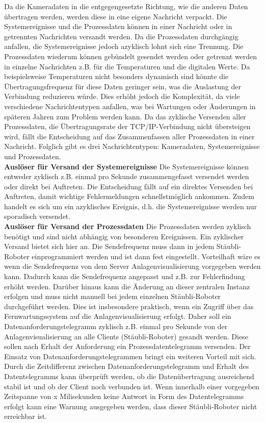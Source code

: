 \documentclass[ a4paper,
                oneside,
                toc=bibliography,
                toc=listof
                ]{scrbook}
\begin{document}
	Da die Kameradaten in die entgegengesetzte Richtung, wie die anderen Daten übertragen werden, werden diese in eine eigene Nachricht verpackt. Die Systemereignisse und die Prozessdaten können in einer Nachricht oder in getrennten Nachrichten versandt werden. Da die Prozessdaten durchgängig anfallen, die Systemereignisse jedoch azyklisch lohnt sich eine Trennung. Die Prozessdaten wiederum können gebündelt gesendet werden oder getrennt werden in einzelne Nachrichten z.B. für die Temperaturen und die digitalen Werte. Da beispielsweise Temperaturen nicht besonders dynamisch sind könnte die Übertragungsfrequenz für diese Daten geringer sein, was die Auslastung der Verbindung reduzieren würde. Dies erhöht jedoch die Komplexität, da viele verschiedene Nachrichtentypen anfallen, was bei Wartungen oder Änderungen in späteren Jahren zum Problem werden kann. Da das zyklische Versenden aller Prozessdaten, die Übertragungsrate der TCP/IP-Verbindung nicht übersteigen wird, fällt die Entscheidung auf das Zusammenfassen aller Prozessdaten in einer Nachricht. Folglich gibt es drei Nachrichtentypen: Kameradaten, Systemereignisse und Prozessdaten.\\
	\textbf{Auslöser für Versand der Systemereignisse}
	Die Systemereignisse können entweder zyklisch z.B. einmal pro Sekunde zusammengefasst versendet werden oder direkt bei Auftreten. Die Entscheidung fällt auf ein direktes Versenden bei Auftreten, damit wichtige Fehlermeldungen schnellstmöglich ankommen. Zudem handelt es sich um ein azyklisches Ereignis, d.h. die Systemereignisse werden nur sporadisch versendet.\\
	\textbf{Auslöser für Versand der Prozessdaten}
	Die Prozessdaten werden zyklisch benötigt und sind nicht abhängig von besonderen Ereignissen. Ein zyklischer Versand bietet sich hier an. Die Sendefrequenz muss dann in jedem Stäubli-Roboter einprogrammiert werden und ist dann fest eingestellt. Vorteilhaft wäre es wenn die Sendefrequenz von dem Server Anlagenvisualisierung vorgegeben werden kann. Dadurch kann die Sendefrequenz angepasst und z.B. zur Fehlerfindung erhöht werden. Darüber hinaus kann die Änderung an dieser zentralen Instanz erfolgen und muss nicht manuell bei jedem einzelnen Stäubli-Roboter durchgeführt werden. Dies ist insbesondere praktisch, wenn ein Zugriff über das Fernwartungssystem auf die Anlagenvisualisierung erfolgt. Daher soll ein Datenanforderungstelegramm zyklisch z.B. einmal pro Sekunde von der Anlagenvisualisierung an alle Clients (Stäubli-Roboter) gesandt werden. Diese sollen nach Erhalt der Anforderung ein Prozessdatentelegramm versenden. Der Einsatz von Datenanforderungstelegrammen bringt ein weiteren Vorteil mit sich. Durch die Zeitdifferenz zwischen Datenanforderungstelegramm und Erhalt des Datentelegramms kann überprüft werden, ob die Datenübertragung ausreichend stabil ist und ob der Client noch verbunden ist. Wenn innerhalb einer vorgegeben Zeitspanne von x Milisekunden keine Antwort in Form des Datentelegramms erfolgt kann eine Warnung ausgegeben werden, dass dieser Stäubli-Roboter nicht erreichbar ist.\\
\end{document}
